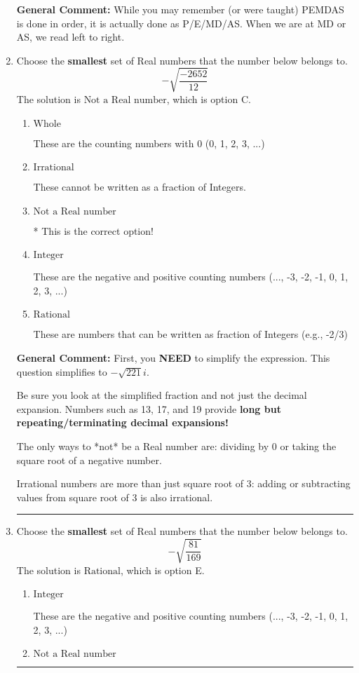 \documentclass{extbook}[14pt]
\newcommand{\litem}[1]{\item #1

\rule{\textwidth}{0.4pt}}
\begin{document}
\begin{enumerate}
{\textbf{General Comment:} While you may remember (or were taught) PEMDAS is done in order, it is actually done as P/E/MD/AS. When we are at MD or AS, we read left to right.
}
\litem{
Choose the \textbf{smallest} set of Real numbers that the number below belongs to.
\[ -\sqrt{\frac{-2652}{12}} \]The solution is \( \text{Not a Real number} \), which is option C.\begin{enumerate}[label=\Alph*.]
\item \( \text{Whole} \)

These are the counting numbers with 0 (0, 1, 2, 3, ...)
\item \( \text{Irrational} \)

These cannot be written as a fraction of Integers.
\item \( \text{Not a Real number} \)

* This is the correct option!
\item \( \text{Integer} \)

These are the negative and positive counting numbers (..., -3, -2, -1, 0, 1, 2, 3, ...)
\item \( \text{Rational} \)

These are numbers that can be written as fraction of Integers (e.g., -2/3)
\end{enumerate}

\textbf{General Comment:} First, you \textbf{NEED} to simplify the expression. This question simplifies to $-\sqrt{221} i$. 
 
 Be sure you look at the simplified fraction and not just the decimal expansion. Numbers such as 13, 17, and 19 provide \textbf{long but repeating/terminating decimal expansions!} 
 
 The only ways to *not* be a Real number are: dividing by 0 or taking the square root of a negative number. 
 
 Irrational numbers are more than just square root of 3: adding or subtracting values from square root of 3 is also irrational.
}
\litem{
Choose the \textbf{smallest} set of Real numbers that the number below belongs to.
\[ -\sqrt{\frac{81}{169}} \]The solution is \( \text{Rational} \), which is option E.\begin{enumerate}[label=\Alph*.]
\item \( \text{Integer} \)

These are the negative and positive counting numbers (..., -3, -2, -1, 0, 1, 2, 3, ...)
\item \( \text{Not a Real number} \)


\end{enumerate}}
\end{enumerate}
\end{document}

